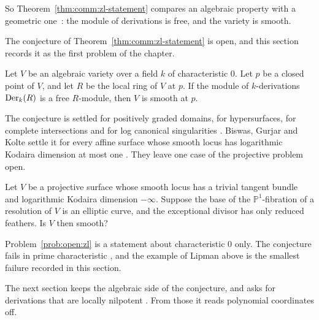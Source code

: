So Theorem~\ref{thm:comm:zl-statement} compares an algebraic property with a
geometric one~\cite[p.~270]{BiswasGurjarKolte2014}: the module of derivations
is free, and the variety is smooth.

The conjecture of Theorem~\ref{thm:comm:zl-statement} is open, and this
section records it as the first problem of the chapter.

\begin{problem}\label{prob:open:zl}
Let $V$ be an algebraic variety over a field $k$ of characteristic $0$.
Let $p$ be a closed point of $V$, and let $R$ be the local ring of $V$ at $p$.
If the module of $k$-derivations $\operatorname{Der}_k(R)$ is a free $R$-module, then $V$ is
smooth at $p$.
\end{problem}

The conjecture is settled for positively graded domains, for hypersurfaces,
for complete intersections and for log canonical singularities
\cite[p.~270]{BiswasGurjarKolte2014}. Biswas, Gurjar and Kolte settle it for
every affine surface whose smooth locus has logarithmic Kodaira dimension at
most one \cite[Theorem~1.2, p.~271]{BiswasGurjarKolte2014}. They leave one
case of the projective problem open.

\begin{problem}\label{prob:open:zl-projective}
Let $V$ be a projective surface whose smooth locus has a trivial tangent bundle
and logarithmic Kodaira dimension $-\infty$.
Suppose the base of the $\mathbb{P}^1$-fibration of a resolution of $V$ is an
elliptic curve, and the exceptional divisor has only reduced feathers.
Is $V$ then smooth?
\end{problem}

Problem~\ref{prob:open:zl} is a statement about characteristic $0$ only. The
conjecture fails in prime characteristic \cite[p.~116]{Graf2022LZPosChar}, and
the example of Lipman above is the smallest failure recorded in this section.

The next section keeps the algebraic side of the conjecture, and asks for
derivations that are locally nilpotent
\cite[Theorem, p.~47]{FerreroLequainNowicki1992}. From those it reads
polynomial coordinates off.
